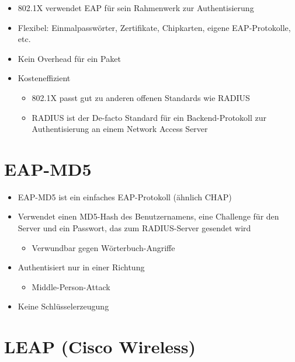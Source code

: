 \documentclass[openany]{book}
\begin{document}
\begin{itemize}
    \item 802.1X verwendet EAP für sein Rahmenwerk zur Authentisierung
    \item Flexibel: Einmalpasswörter, Zertifikate, Chipkarten, eigene EAP-Protokolle, etc.
    \item Kein Overhead für ein Paket
    \item Kosteneffizient
    \begin{itemize}
        \item 802.1X passt gut zu anderen offenen Standards wie RADIUS
        \item RADIUS ist der De-facto Standard für ein Backend-Protokoll zur Authentisierung an einem Network Access Server
    \end{itemize}
\end{itemize}

\section{EAP-MD5}

\begin{itemize}
    \item EAP-MD5 ist ein einfaches EAP-Protokoll (ähnlich CHAP)
    \item Verwendet einen MD5-Hash des Benutzernamens, eine Challenge für den Server und ein Passwort, das zum RADIUS-Server gesendet wird
    \begin{itemize}
        \item Verwundbar gegen Wörterbuch-Angriffe
    \end{itemize}
    \item Authentisiert nur in einer Richtung
    \begin{itemize}
        \item Middle-Person-Attack
    \end{itemize}
    \item Keine Schlüsselerzeugung
\end{itemize}

\section{LEAP (Cisco Wireless)}
\end{document}
